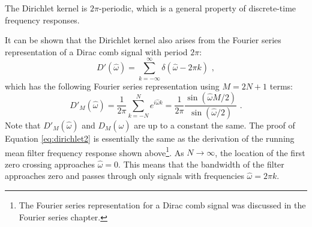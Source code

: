 \begin{marginfigure}
    \begin{center}
    \end{center}
    \caption{The Dirichlet kernel is $2\pi$-periodic, which is a general property of discrete-time frequency responses.}
    \label{fig:dir_kernel2}
\end{marginfigure}

It can be shown that the Dirichlet kernel also arises from the Fourier
series representation of a Dirac comb signal with period $2\pi$:
\begin{equation}
    D'(\hat{\omega}) = \sum_{k=-\infty}^{\infty} \delta(\hat{\omega}-2\pi k) \,\,,
    \label{eq:dirac_comb_dirichlet}
\end{equation}
which has the following Fourier series representation using $M=2N+1$ terms:
\begin{equation}
    D'_M(\hat{\omega}) = \frac{1}{2\pi}\sum_{k=-N}^{N} e^{i \hat{\omega} k} = \frac{1}{2\pi}\frac{ \sin(\hat{\omega}M/2) }{\sin(\hat{\omega}/2)} \,\,.
    \label{eq:dirichlet2}
\end{equation}
Note that $D'_M(\hat{\omega})$ and $D_M(\hat{\omega})$ are up to a
constant the same. The proof of Equation \ref{eq:dirichlet2} is
essentially the same as the derivation of the running mean filter
frequency response shown above\footnote{The Fourier series
    representation for a Dirac comb signal was discussed in the Fourier
    series chapter.}. As $N\rightarrow \infty$, the location of the first
zero crossing approaches $\hat{\omega}=0$. This means that the
bandwidth of the filter approaches zero and passes through only
signals with frequencies $\hat{\omega}=2\pi k$.

